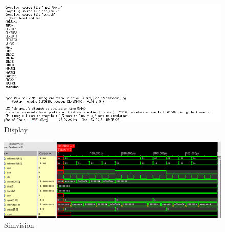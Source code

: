 \documentclass[12pt]{article}
\begin{document}
\begin{figure}[H]
\centering
\includegraphics[width=\linewidth]{../CSA/synth-text-CSA}
\caption{Display}
\label{fig:synth-text-CSA}
\end{figure}


\begin{figure}[H]
\centering
\includegraphics[width=\linewidth]{../CSA/synth-test-CSA}
\caption{Simvision}
\label{fig:synth-test-CSA}
\end{figure}
\end{document}
